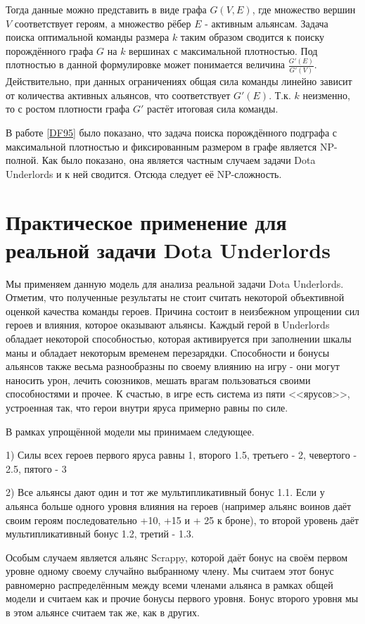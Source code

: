 \documentclass{article}
\begin{document}
Тогда данные можно представить в виде графа $G(V, E)$, где множество вершин $V$ соответствует героям, а множество рёбер $E$ - активным альянсам. Задача поиска оптимальной команды размера $k$ таким образом сводится к поиску порождённого графа $G$ на $k$ вершинах с максимальной плотностью. Под плотностью в данной формулировке может понимается величина $\frac{G'(E)}{G'(V)}$. Действительно, при данных ограничениях общая сила команды линейно зависит от количества активных альянсов, что соответствует $G'(E)$. Т.к. $k$ неизменно, то с ростом плотности графа $G'$ растёт итоговая сила команды.

В работе \ref{DF95} было показано, что задача поиска порождённого подграфа с максимальной плотностью и фиксированным размером в графе является NP-полной. Как было показано, она является частным случаем задачи Dota Underlords и к ней сводится. Отсюда следует её NP-сложность.


\section{Практическое применение для реальной задачи Dota Underlords}
  
Мы применяем данную модель для анализа реальной задачи Dota Underlords. Отметим, что полученные результаты не стоит считать некоторой объективной оценкой качества команды героев. Причина состоит в неизбежном упрощении сил героев и влияния, которое оказывают альянсы. Каждый герой в Underlords обладает некоторой способностью, которая активируется при заполнении шкалы маны и обладает некоторым временем перезарядки. Способности и бонусы альянсов также весьма разнообразны по своему влиянию на игру - они могут наносить урон, лечить союзников, мешать врагам пользоваться своими способностями и прочее. К счастью, в игре есть система из пяти <<ярусов>>, устроенная так, что герои внутри яруса примерно равны по силе.

В рамках упрощённой модели мы принимаем следующее.

1) Силы всех героев первого яруса равны 1, второго 1.5, третьего - 2, чевертого - 2.5, пятого - 3

2) Все альянсы дают один и тот же мультипликативный бонус 1.1. Если у альянса больше одного уровня влияния на героев (например альянс воинов даёт своим героям последовательно +10, +15 и + 25 к броне), то второй уровень даёт мультипликативный бонус 1.2, третий - 1.3.

Особым случаем является альянс Scrappy, которой даёт бонус на своём первом уровне одному своему случайно выбранному члену. Мы считаем этот бонус равномерно распределённым между всеми членами альянса в рамках общей модели и считаем как и прочие бонусы первого уровня. Бонус второго уровня мы в этом альянсе считаем так же, как в других.
\end{document}
